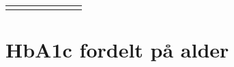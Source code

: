 \documentclass[]{article}
\begin{document}
\begin{table}[H]
\begin{raggedright}
\begin{threeparttable}
\begin{tabularx}{0.9\textwidth}{p{} p{} p{} p{} p{} p{} p{} p{}}
\hhline{}
\arrayrulecolor{black}
\end{tabularx}\end{threeparttable}
\par\end{raggedright}

\end{table}
 

\newpage

\hypertarget{hba1c-fordelt-pa-alder}{%
\section{HbA1c fordelt på alder}\label{hba1c-fordelt-pa-alder}}

 
  \providecommand{\huxb}[2]{\arrayrulecolor[RGB]{#1}\global\arrayrulewidth=#2pt}
  \providecommand{\huxvb}[2]{\color[RGB]{#1}\vrule width #2pt}
  \providecommand{\huxtpad}[1]{\rule{0pt}{\baselineskip+#1}}
  \providecommand{\huxbpad}[1]{\rule[-#1]{0pt}{#1}}
\end{document}
